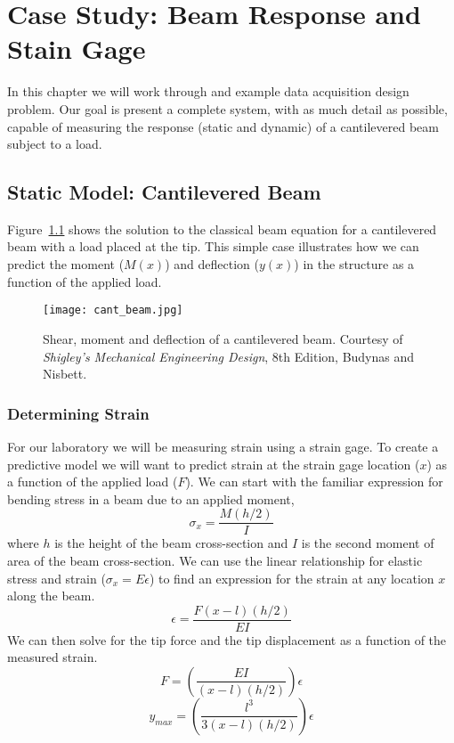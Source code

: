 \chapter{Case Study: Beam Response and Stain Gage}\label{c:strain}

In this chapter we will work through and example data acquisition design problem.  Our goal is present a complete system, with as much detail as possible, capable of measuring the response (static and dynamic) of a cantilevered beam subject to a load.

\section{Static Model: Cantilevered Beam}

Figure~\ref{f:cant} shows the solution to the classical beam equation for a cantilevered beam with a load placed at the tip.  This simple case illustrates how we can predict the moment ($M(x)$) and deflection ($y(x)$) in the structure as a function of the applied load.

\begin{figure}[hb!]
\centerline{
{\texttt{[image: cant\_beam.jpg]}}}
\caption{Shear, moment and deflection of a cantilevered beam.  Courtesy of \emph{Shigley's Mechanical Engineering Design}, 8th Edition, Budynas and Nisbett.}
\label{f:cant}
\end{figure}


\subsection*{Determining Strain}
For our laboratory we will be measuring strain using a strain gage.  To create a predictive model we will want to predict strain at the strain gage location ($x$) as a function of the applied load ($F$).  We can start with the familiar expression for bending stress in a beam due to an applied moment,
\[
\sigma_x=\frac{M(h/2)}{I}
\]
where $h$ is the height of the beam cross-section and $I$ is the second moment of area of the beam cross-section.  We can use the linear relationship for elastic stress and strain ($\sigma_x = E \epsilon$) to find an expression for the strain at any location $x$ along the beam.
\[
\epsilon = \frac{F(x-l)(h/2)}{EI}
\]
We can then solve for the tip force and the tip displacement as a function of the measured strain.
\[ F = \left( \frac{EI}{(x-l)(h/2)} \right) \epsilon \]
\[ y_{max}=\left( \frac{l^3}{3(x-l)(h/2)} \right) \epsilon \]

